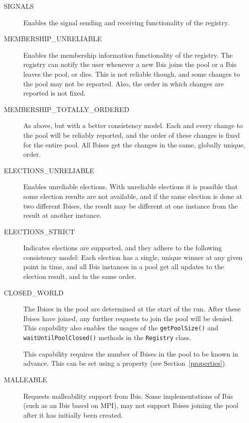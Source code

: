 \documentclass[10pt]{article}
\begin{document}
\begin{description}

\item[SIGNALS]
Enables the signal sending and receiving functionality of the registry.

\item[MEMBERSHIP\_UNRELIABLE] 
Enables the membership information functionality of the registry. The
registry can notify the user whenever a new Ibis joins the pool or a
Ibis leaves the pool, or dies. This is not reliable though, and some
changes to the pool may not be reported. Also, the order in which
changes are reported is not fixed.

\item[MEMBERSHIP\_TOTALLY\_ORDERED]
As above, but with a better consistency model. Each and every change to
the pool will be reliably reported, and the order of these changes is
fixed for the entire pool. All Ibises get the changes in the same,
globally unique, order.

\item[ELECTIONS\_UNRELIABLE] Enables unreliable elections. With
unreliable elections it is possible that some election results are not
available, and if the same election is done at two different Ibises, the
result may be different at one instance from the result at another instance.

\item[ELECTIONS\_STRICT]
Indicates elections are supported, and they adhere to the following 
consistency model: Each election has a single, unique winner at any
given point in time, and all Ibis instances in a pool get all updates
to the election result, and in the same order.

\item[CLOSED\_WORLD] The Ibises in the pool are determined at the start
of the run. After these Ibises have joined, any further requests to join
the pool will be denied. This capability also enables the usages of the
\texttt{getPoolSize()} and \texttt{waitUntilPoolClosed()} methods in the
\texttt{Registry} class. 

This capability requires the number of Ibises
in the pool to be known in advance. This can be set using a property
(see Section~\ref{properties}).

\item[MALLEABLE]
Requests malleability support from Ibis. Some implementations of Ibis
(such as an Ibis based on MPI), may not support Ibises joining the pool
after it has initially been created.

\end{description}
\end{document}
